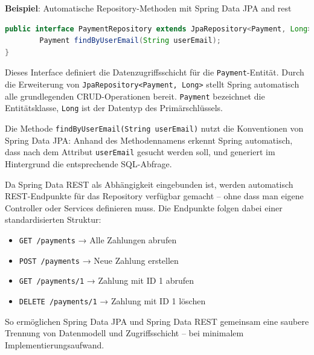 \noindent \textbf{Beispiel}: Automatische Repository-Methoden mit Spring Data JPA and rest
\begin{lstlisting}[language=Java, caption={Payments-Repository-Schnittstelle}, label={lst:Payment-repo}]
public interface PaymentRepository extends JpaRepository<Payment, Long> {
	    Payment findByUserEmail(String userEmail);
}

\end{lstlisting}

\noindent Dieses Interface definiert die Datenzugriffsschicht für die \texttt{Payment}-Entität. Durch die Erweiterung von \texttt{JpaRepository<Payment, Long>} stellt Spring automatisch alle grundlegenden CRUD-Operationen bereit. \texttt{Payment} bezeichnet die Entitätsklasse, \texttt{Long} ist der Datentyp des Primärschlüssels.

\noindent Die Methode \texttt{findByUserEmail(String userEmail)} nutzt die Konventionen von Spring Data JPA: Anhand des Methodennamens erkennt Spring automatisch, dass nach dem Attribut \texttt{userEmail} gesucht werden soll, und generiert im Hintergrund die entsprechende SQL-Abfrage.

\noindent Da Spring Data REST als Abhängigkeit eingebunden ist, werden automatisch REST-Endpunkte für das Repository verfügbar gemacht – ohne dass man eigene Controller oder Services definieren muss. Die Endpunkte folgen dabei einer standardisierten Struktur:

\begin{itemize}
	\item \texttt{GET /payments} → Alle Zahlungen abrufen
	\item \texttt{POST /payments} → Neue Zahlung erstellen
	\item \texttt{GET /payments/1} → Zahlung mit ID 1 abrufen
	\item \texttt{DELETE /payments/1} → Zahlung mit ID 1 löschen
\end{itemize}

\noindent So ermöglichen Spring Data JPA und Spring Data REST gemeinsam eine saubere Trennung von Datenmodell und Zugriffsschicht – bei minimalem Implementierungsaufwand.


